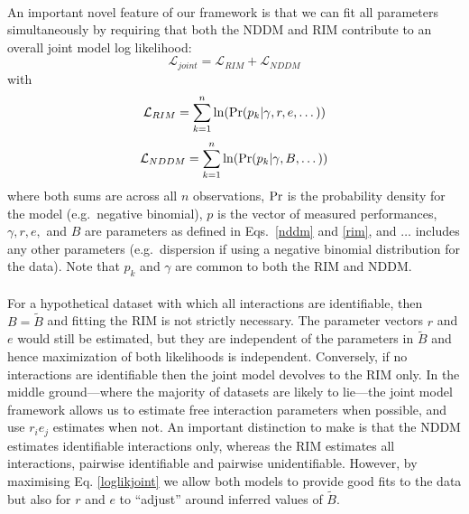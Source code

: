 \documentclass[a4,12pt]{article}
\begin{document}
\begin{refsection}
    \paragraph{}
    An important novel feature of our framework is that we can fit all parameters simultaneously by requiring that both the NDDM and RIM contribute to an overall joint model log likelihood:
         \begin{equation}
        \mathcal{L}_{joint} = \mathcal{L}_{RIM} + \mathcal{L}_{NDDM}
        \label{loglikjoint}
        \end{equation}
    with
        \begin{equation}
        \mathcal{L}_{RIM} = \sum_{k=1}^{n} \ln ({\rm Pr} (p_k | \gamma, r, e, \dots))
        \label{logrim}
        \end{equation}
        \begin{equation}
        \mathcal{L}_{NDDM} = \sum_{k=1}^{n} \ln ({\rm Pr} (p_k | \gamma, B, \dots))
        \label{lognddm}
        \end{equation}
    where both sums are across all $n$ observations, ${\rm Pr}$ is the probability density for the model (e.g.\ negative binomial), $p$ is the vector of measured performances, $\gamma, r, e,$ and $B$ are parameters as defined in Eqs.~\ref{nddm} and \ref{rim}, and $\dots$ includes any other parameters (e.g.\ dispersion if using a negative binomial distribution for the data). Note that $p_k$ and $\gamma$ are common to both the RIM and NDDM.

    \paragraph{}
    For a hypothetical dataset with which all interactions are identifiable, then $B = \tilde B$ and fitting the RIM is not strictly necessary. The parameter vectors $r$ and $e$ would still be estimated, but they are independent of the parameters in $\tilde B$ and hence maximization of both likelihoods is independent. Conversely, if no interactions are identifiable then the joint model devolves to the RIM only. In the middle ground---where the majority of datasets are likely to lie---the joint model framework allows us to estimate free interaction parameters when possible, and use $r_i e_j$ estimates when not. An important distinction to make is that the NDDM estimates identifiable interactions only, whereas the RIM estimates all interactions, pairwise identifiable and pairwise unidentifiable. However, by maximising Eq. \ref{loglikjoint} we allow both models to provide good fits to the data but also for $r$ and $e$ to ``adjust'' around inferred values of $\tilde B$. 



\end{refsection}
\end{document}
